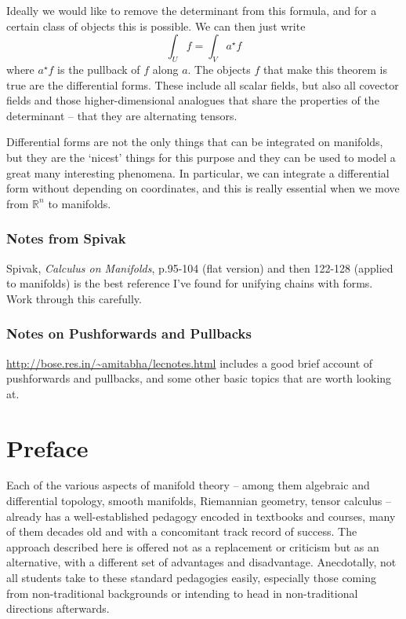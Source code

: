 \documentclass[oneside,english]{amsbook}
\numberwithin{section}{chapter}
\theoremstyle{plain}
\theoremstyle{definition}
\begin{document}
Ideally we would like to remove the determinant from this formula, and for a certain class of objects this is possible. We can then just write
\[
\int_U f = \int_V a^\star f
\]
where $a^\star f$ is the pullback of $f$ along $a$. The objects $f$ that make this theorem is true are the differential forms. These include all scalar fields, but also all covector fields and those higher-dimensional analogues that share the properties of the determinant -- that they are alternating tensors.

Differential forms are not the only things that can be integrated on manifolds, but they are the `nicest' things for this purpose and they can be used to model a great many interesting phenomena. In particular, we can integrate a differential form without depending on coordinates, and this is really essential when we move from $\mathbb{R}^n$ to manifolds.

\subsection{Notes from Spivak}

Spivak, \emph{Calculus on Manifolds}, p.95-104 (flat version) and then 122-128 (applied to manifolds) is the best reference I've found for unifying chains with forms. Work through this carefully.



\subsection{Notes on Pushforwards and Pullbacks}

\url{http://bose.res.in/~amitabha/lecnotes.html} includes a good brief account of pushforwards and pullbacks, and some other basic topics that are worth looking at.

\chapter*{Preface}

Each of the various aspects of manifold theory -- among them algebraic and differential topology, smooth manifolds, Riemannian geometry, tensor calculus -- already has a well-established pedagogy encoded in textbooks and courses, many of them decades old and with a concomitant track record of success. The approach described here is offered not as a replacement or criticism but as an alternative, with a different set of advantages and disadvantage. Anecdotally, not all students take to these standard pedagogies easily, especially those coming from non-traditional backgrounds or intending to head in non-traditional directions afterwards.
\end{document}
